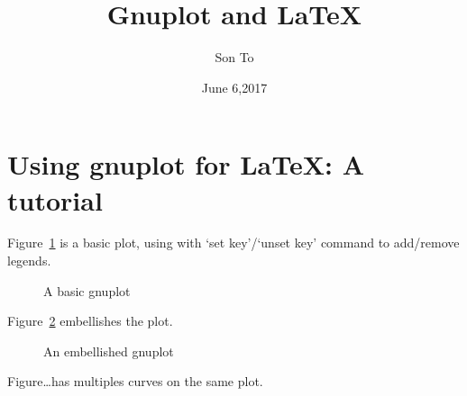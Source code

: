 \documentclass[a4paper,11pt]{article}
\title{Gnuplot and LaTeX}
\author{Son To}
\date{June 6,2017}
\begin{document}
\maketitle
\tableofcontents
\newpage
\section{Using gnuplot for LaTeX: A tutorial}
Figure~\ref{fig:eg1} is a basic plot, using with `set key'/`unset key'
command to add/remove legends.
  \begin{figure}
    \begin{center}
      
      \caption{A basic gnuplot}
      \label{fig:eg1}
    \end{center}
  \end{figure}

Figure~\ref{fig:eg2} embellishes the plot.
\begin{figure}
  \begin{center}
    
    \caption{An embellished gnuplot}
    \label{fig:eg2}
  \end{center}
\end{figure}

Figure\ldots has multiples curves on the same plot.
\end{document}

